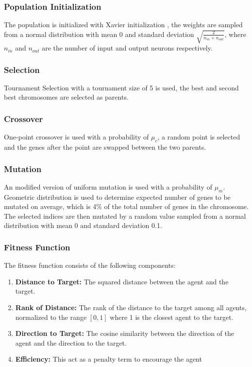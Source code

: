 \documentclass[sigconf]{acmart}
\begin{document}
\subsubsection{Population Initialization} The population is initialized with Xavier initialization \cite{Xavier_pmlr-v9-glorot10a}, the weights are sampled from a normal distribution with mean 0 and standard deviation $\sqrt{\frac{2}{n_{in} + n_{out}}}$, where $n_{in}$ and $n_{out}$ are the number of input and output neurons respectively.
\subsubsection{Selection} Tournament Selection with a tournament size of 5 is used, the best and second best chromosomes are selected as parents.
\subsubsection{Crossover} One-point crossover is used with a probability of $\mu_c$, a random point is selected and the genes after the point are swapped between the two parents.
\subsubsection{Mutation} An modified version of uniform mutation is used with a probability of $\mu_m$. Geometric distribution is used to determine expected number of genes to be mutated on average, which is 4\% of the total number of genes in the chromosome. The selected indices are then mutated by a random value sampled from a normal distribution with mean 0 and standard deviation 0.1. 
\subsubsection{Fitness Function}
The fitness function consists of the following components:
\begin{enumerate}
  \item \textbf{Distance to Target:} The squared distance between the agent and the target.
  \item \textbf{Rank of Distance:} The rank of the distance to the target among all agents, normalized to the range $[0, 1]$ where 1 is the closest agent to the target.
  \item \textbf{Direction to Target:} The cosine similarity between the direction of the agent and the direction to the target.
  \item \textbf{Efficiency:} This act as a penalty term to encourage the agent 
\end{enumerate}
\end{document}
